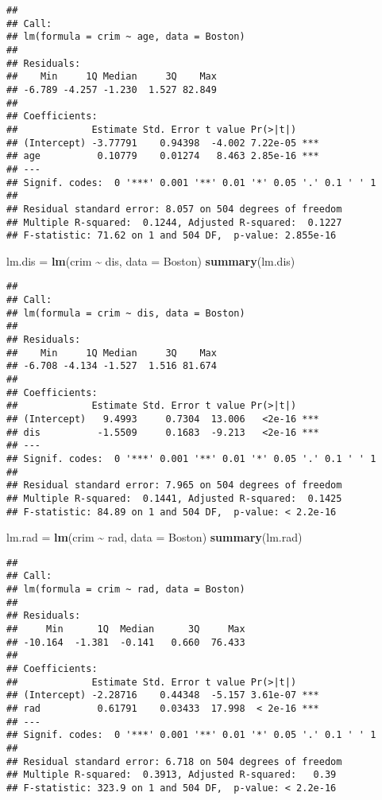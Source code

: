 \documentclass[
]{article}
\newenvironment{Shaded}{\begin{snugshade}}{\end{snugshade}}
\newcommand{\AttributeTok}[1]{\textcolor[rgb]{0.13,0.29,0.53}{#1}}
\newcommand{\FunctionTok}[1]{\textcolor[rgb]{0.13,0.29,0.53}{\textbf{#1}}}
\newcommand{\NormalTok}[1]{#1}
\newcommand{\OtherTok}[1]{\textcolor[rgb]{0.56,0.35,0.01}{#1}}
\newcommand{\SpecialCharTok}[1]{\textcolor[rgb]{0.81,0.36,0.00}{\textbf{#1}}}
\begin{document}
\begin{verbatim}
## 
## Call:
## lm(formula = crim ~ age, data = Boston)
## 
## Residuals:
##    Min     1Q Median     3Q    Max 
## -6.789 -4.257 -1.230  1.527 82.849 
## 
## Coefficients:
##             Estimate Std. Error t value Pr(>|t|)    
## (Intercept) -3.77791    0.94398  -4.002 7.22e-05 ***
## age          0.10779    0.01274   8.463 2.85e-16 ***
## ---
## Signif. codes:  0 '***' 0.001 '**' 0.01 '*' 0.05 '.' 0.1 ' ' 1
## 
## Residual standard error: 8.057 on 504 degrees of freedom
## Multiple R-squared:  0.1244, Adjusted R-squared:  0.1227 
## F-statistic: 71.62 on 1 and 504 DF,  p-value: 2.855e-16
\end{verbatim}

\begin{Shaded}
\begin{Highlighting}[]
\NormalTok{lm.dis }\OtherTok{=} \FunctionTok{lm}\NormalTok{(crim }\SpecialCharTok{\textasciitilde{}}\NormalTok{ dis, }\AttributeTok{data =}\NormalTok{ Boston)}
\FunctionTok{summary}\NormalTok{(lm.dis)}
\end{Highlighting}
\end{Shaded}

\begin{verbatim}
## 
## Call:
## lm(formula = crim ~ dis, data = Boston)
## 
## Residuals:
##    Min     1Q Median     3Q    Max 
## -6.708 -4.134 -1.527  1.516 81.674 
## 
## Coefficients:
##             Estimate Std. Error t value Pr(>|t|)    
## (Intercept)   9.4993     0.7304  13.006   <2e-16 ***
## dis          -1.5509     0.1683  -9.213   <2e-16 ***
## ---
## Signif. codes:  0 '***' 0.001 '**' 0.01 '*' 0.05 '.' 0.1 ' ' 1
## 
## Residual standard error: 7.965 on 504 degrees of freedom
## Multiple R-squared:  0.1441, Adjusted R-squared:  0.1425 
## F-statistic: 84.89 on 1 and 504 DF,  p-value: < 2.2e-16
\end{verbatim}

\begin{Shaded}
\begin{Highlighting}[]
\NormalTok{lm.rad }\OtherTok{=} \FunctionTok{lm}\NormalTok{(crim }\SpecialCharTok{\textasciitilde{}}\NormalTok{ rad, }\AttributeTok{data =}\NormalTok{ Boston)}
\FunctionTok{summary}\NormalTok{(lm.rad)}
\end{Highlighting}
\end{Shaded}

\begin{verbatim}
## 
## Call:
## lm(formula = crim ~ rad, data = Boston)
## 
## Residuals:
##     Min      1Q  Median      3Q     Max 
## -10.164  -1.381  -0.141   0.660  76.433 
## 
## Coefficients:
##             Estimate Std. Error t value Pr(>|t|)    
## (Intercept) -2.28716    0.44348  -5.157 3.61e-07 ***
## rad          0.61791    0.03433  17.998  < 2e-16 ***
## ---
## Signif. codes:  0 '***' 0.001 '**' 0.01 '*' 0.05 '.' 0.1 ' ' 1
## 
## Residual standard error: 6.718 on 504 degrees of freedom
## Multiple R-squared:  0.3913, Adjusted R-squared:   0.39 
## F-statistic: 323.9 on 1 and 504 DF,  p-value: < 2.2e-16
\end{verbatim}
\end{document}
